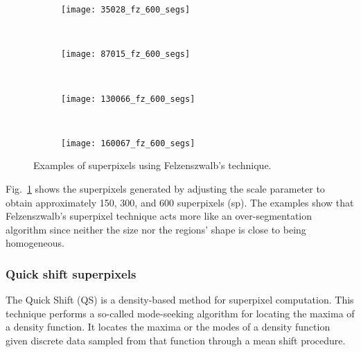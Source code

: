 \begin{figure}[!ht]
    \begin{subfigure}[t]{\textwidth+20pt\relax}
    	\texttt{[image: 35028\_fz\_600\_segs]} 
    \end{subfigure}      
    ~ %
    \begin{subfigure}[b]{0.2\textwidth}
        \texttt{[image: 87015\_fz\_600\_segs]}
    \end{subfigure}
    ~ %
    \begin{subfigure}[b]{0.2\textwidth}
        \texttt{[image: 130066\_fz\_600\_segs]}
    \end{subfigure}
    ~ %
    \begin{subfigure}[b]{0.2\textwidth}
        \texttt{[image: 160067\_fz\_600\_segs]}
    \end{subfigure}     

	\caption{Examples of superpixels using Felzenszwalb's technique.}\label{fig:fz_suprepixels}    
\end{figure}

Fig.\ \ref{fig:fz_suprepixels} shows the superpixels generated by adjusting the scale parameter to obtain approximately 150, 300, and 600 superpixels (sp). The examples show that Felzenszwalb's superpixel technique acts more like an over-segmentation algorithm since neither the size nor the regions' shape is close to being homogeneous.
 
\subsubsection{Quick shift superpixels} 

The Quick Shift (QS) \citep{Vedaldi.Soatto:ECCV:2008} is a density-based method for superpixel computation. This technique performs a so-called mode-seeking algorithm \citep{YizongCheng:PAMI:1995} for locating the maxima of a density function. It locates the maxima or the modes of a density function given discrete data sampled from that function through a mean shift procedure.

